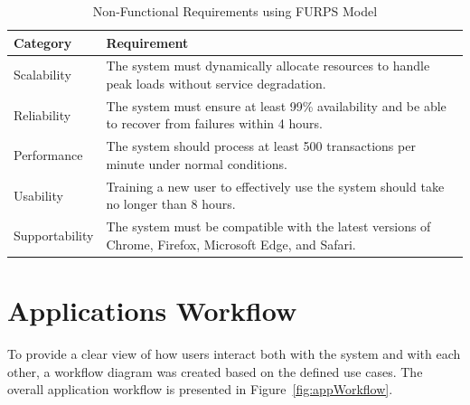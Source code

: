 \begin{table}[htbp]
\centering
\begin{tabular}{|l|p{10cm}|}
\hline
\textbf{Category} & \textbf{Requirement} \\ \hline
Scalability & The system must dynamically allocate resources to handle peak loads without service degradation. \\ \hline
Reliability & The system must ensure at least 99\% availability and be able to recover from failures within 4 hours. \\ \hline
Performance & The system should process at least 500 transactions per minute under normal conditions. \\ \hline
Usability & Training a new user to effectively use the system should take no longer than 8 hours. \\ \hline
Supportability & The system must be compatible with the latest versions of Chrome, Firefox, Microsoft Edge, and Safari. \\ \hline
\end{tabular} 
\caption{Non-Functional Requirements using FURPS Model}
\label{table:non_functional_requirements}
\end{table}



\section{Applications Workflow}

To provide a clear view of how users interact both with the system and with each other, a workflow diagram was created based on the defined use cases. The overall application workflow is presented in Figure~\ref{fig:appWorkflow}.

